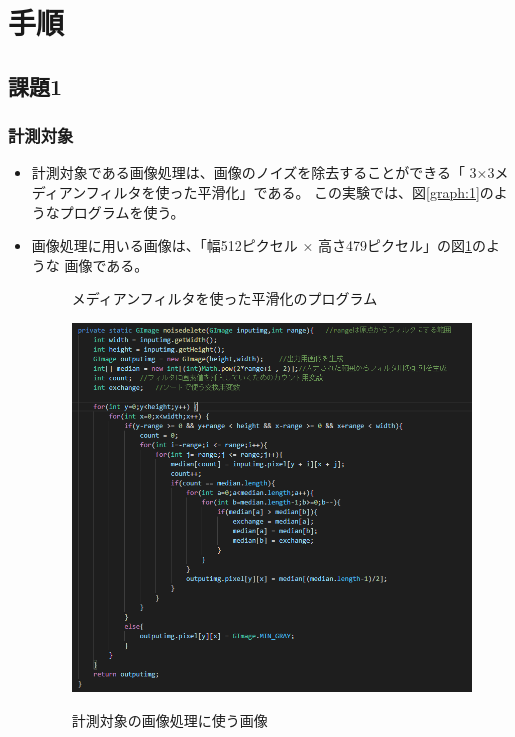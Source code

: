 \section{手順}
\subsection{課題1}
\subsubsection{計測対象}
\begin{itemize}
  \item 計測対象である画像処理は、画像のノイズを除去することができる「
  3×3メディアンフィルタを使った平滑化」である。
  この実験では、図\ref{graph:1}のようなプログラムを使う。
  \item 画像処理に用いる画像は、「幅512ピクセル × 高さ479ピクセル」の図\ref{graph:2}のような
  画像である。
  \begin{figure}[hbtp]
    \begin{minipage}[t]{\hsize}   
      \centering
      \caption{メディアンフィルタを使った平滑化のプログラム}
      \label{graph:1}
      \includegraphics[scale = 0.75]{noisedeleteの中身1.PNG}
    \end{minipage}
    \begin{minipage}[t]{\hsize}
      \centering
      \caption{計測対象の画像処理に使う画像}
      \label{graph:2}

\end{minipage}
\end{figure}
\end{itemize}
